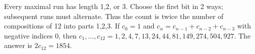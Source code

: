 Every maximal run has length 1,2, or 3. Choose the first bit in 2 ways; subsequent runs must alternate. Thus the count is twice the number of compositions of 12 into parts 1,2,3. If $c_0=1$ and $c_n=c_{n-1}+c_{n-2}+c_{n-3}$ with negative indices 0, then $c_1,\ldots,c_{12}=1,2,4,7,13,24,44,81,149,274,504,927$. The answer is $2c_{12}=\boxed{1854}$.
